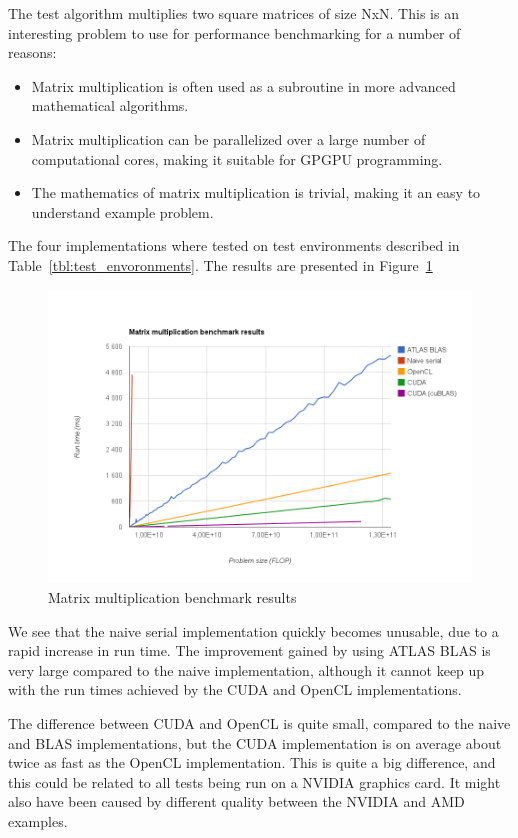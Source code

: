 The test algorithm multiplies two square matrices of size NxN. This is an interesting problem to use for performance benchmarking for a number of reasons:

\begin{itemize}
    \item Matrix multiplication is often used as a subroutine in more advanced mathematical algorithms.
    \item Matrix multiplication can be parallelized over a large number of computational cores, making it suitable for GPGPU programming.
    \item The mathematics of matrix multiplication is trivial, making it an easy to understand example problem.
\end{itemize}

The four implementations where tested on test environments described in Table~\ref{tbl:test_envoronments}. The results are presented in Figure~\ref{fig:matrix-multiplication-benchmark-results}

\begin{figure}[ht!]
    \centering
    \includegraphics[width=120mm]{../gfx/matrix-multiplication-benchmark-results.png}
    \caption{Matrix multiplication benchmark results}
    \label{fig:matrix-multiplication-benchmark-results}
\end{figure}

We see that the naive serial implementation quickly becomes unusable, due to a rapid increase in run time. The improvement gained by using ATLAS BLAS is very large compared to the naive implementation, although it cannot keep up with the run times achieved by the CUDA and OpenCL implementations.

The difference between CUDA and OpenCL is quite small, compared to the naive and BLAS implementations, but the CUDA implementation is on average about twice as fast as the OpenCL implementation. This is quite a big difference, and this could be related to all tests being run on a NVIDIA graphics card. It might also have been caused by different quality between the NVIDIA and AMD examples.

